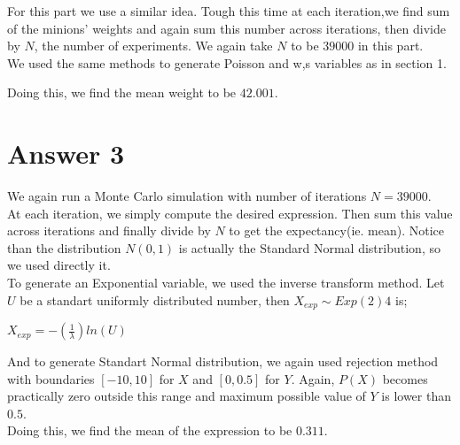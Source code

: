 \documentclass[12pt]{article}
\begin{document}
For this part we use a similar idea. Tough this time at each iteration,we find sum of the minions' weights and again sum this number across iterations, then divide by $N$, the number of experiments. We again take $N$ to be $39000$ in this part. \\

We used the same methods to generate Poisson and w,s variables as in section 1.

Doing this, we find the mean weight to be $42.001$.

\section*{Answer 3}

We again run a Monte Carlo simulation with number of iterations $N=39000$. \\

At each iteration, we simply compute the desired expression. Then sum this value across iterations and finally divide by $N$ to get the expectancy(ie. mean). Notice than the distribution $N(0,1)$ is actually the Standard Normal distribution, so we used directly it. \\

To generate an Exponential variable, we used the inverse transform method. Let $U$ be a standart uniformly distributed number, then $ X_{exp}\sim Exp(2)4$ is;

\begin{center}
$ X_{exp}=-(\frac{1}{\lambda})ln(U) $
\end{center}

And to generate Standart Normal distribution, we again used rejection method with boundaries $[-10,10]$ for $X$ and $[0,0.5]$ for $Y$. Again, $P(X)$ becomes practically zero outside this range and maximum possible value of $Y$ is lower than $0.5$. \\

Doing this, we find the mean of the expression to be $0.311$.
\end{document}
